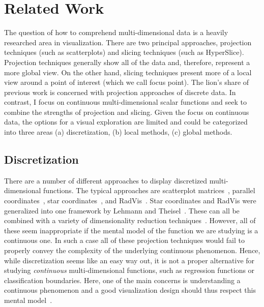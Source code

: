\section{Related Work}\label{sec:background}

The question of how to comprehend multi-dimensional data is a heavily
researched area in visualization. There are two principal approaches,
projection techniques (such as scatterplots) and slicing techniques (such as
HyperSlice). Projection techniques generally show all of the data and,
therefore, represent a more global view. On the other hand, slicing techniques
present more of a local view around a point of interest (which we call focus
point). The lion's share of previous work is concerned with projection
approaches of discrete data. In contrast, I focus on continuous
multi-dimensional scalar functions and seek to combine the strengths of
projection and slicing. Given the focus on continuous data, the options for a
visual exploration are limited and could be categorized into three areas (a)
discretization, (b) local methods, (c) global methods.

\subsection{Discretization}

There are a number of different approaches to display discretized
multi-dimensional functions. The typical approaches are scatterplot
matrices~\cite{Hartigan:1975}, parallel coordinates~\cite{Inselberg:1985}, star
coordinates~\cite{Kandogan:2000}, and RadVis~\cite{Hoffman:1997}. 
Star coordinates and RadVis were generalized into one framework by Lehmann
and Theisel~\cite{Lehmann:2016a}.
These can all be combined with a variety of dimensionality
reduction techniques~\cite{Holbrey:2006}. However, all of these seem
inappropriate if the mental model of the function we are studying is a continuous
one. In such a case all of these projection techniques would fail to properly
convey the complexity of the underlying continuous phenomenon. Hence, while
discretization seems like an easy way out, it is not a proper alternative for
studying \emph{continuous} multi-dimensional functions, such as regression
functions or classification boundaries. Here, one of the main concerns is
understanding a continuous phenomenon and a good visualization design should
thus respect this mental model~\cite{Tory:2004a,Sedlmair:2012,Liu:2010a}.

